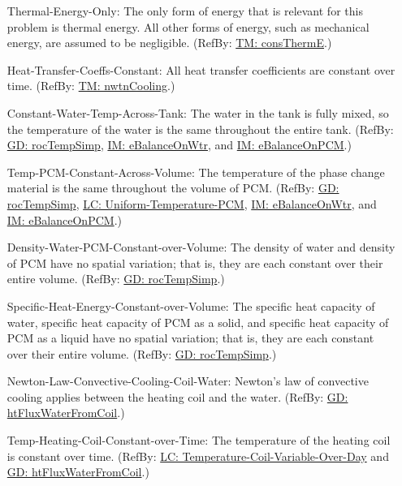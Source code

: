 \documentclass[12pt]{article}
\begin{document}
\begin{itemize}
\item[Thermal-Energy-Only:\phantomsection\label{assumpTEO}]{The only form of energy that is relevant for this problem is thermal energy. All other forms of energy, such as mechanical energy, are assumed to be negligible. (RefBy: \hyperref[TM:consThermE]{TM: consThermE}.)}
\item[Heat-Transfer-Coeffs-Constant:\phantomsection\label{assumpHTCC}]{All heat transfer coefficients are constant over time. (RefBy: \hyperref[TM:nwtnCooling]{TM: nwtnCooling}.)}
\item[Constant-Water-Temp-Across-Tank:\phantomsection\label{assumpCWTAT}]{The water in the tank is fully mixed, so the temperature of the water is the same throughout the entire tank. (RefBy: \hyperref[GD:rocTempSimp]{GD: rocTempSimp}, \hyperref[IM:eBalanceOnWtr]{IM: eBalanceOnWtr}, and \hyperref[IM:eBalanceOnPCM]{IM: eBalanceOnPCM}.)}
\item[Temp-PCM-Constant-Across-Volume:\phantomsection\label{assumpTPCAV}]{The temperature of the phase change material is the same throughout the volume of PCM. (RefBy: \hyperref[GD:rocTempSimp]{GD: rocTempSimp}, \hyperref[likeChgUTP]{LC: Uniform-Temperature-PCM}, \hyperref[IM:eBalanceOnWtr]{IM: eBalanceOnWtr}, and \hyperref[IM:eBalanceOnPCM]{IM: eBalanceOnPCM}.)}
\item[Density-Water-PCM-Constant-over-Volume:\phantomsection\label{assumpDWPCoV}]{The density of water and density of PCM have no spatial variation; that is, they are each constant over their entire volume. (RefBy: \hyperref[GD:rocTempSimp]{GD: rocTempSimp}.)}
\item[Specific-Heat-Energy-Constant-over-Volume:\phantomsection\label{assumpSHECov}]{The specific heat capacity of water, specific heat capacity of PCM as a solid, and specific heat capacity of PCM as a liquid have no spatial variation; that is, they are each constant over their entire volume. (RefBy: \hyperref[GD:rocTempSimp]{GD: rocTempSimp}.)}
\item[Newton-Law-Convective-Cooling-Coil-Water:\phantomsection\label{assumpLCCCW}]{Newton's law of convective cooling applies between the heating coil and the water. (RefBy: \hyperref[GD:htFluxWaterFromCoil]{GD: htFluxWaterFromCoil}.)}
\item[Temp-Heating-Coil-Constant-over-Time:\phantomsection\label{assumpTHCCoT}]{The temperature of the heating coil is constant over time. (RefBy: \hyperref[likeChgTCVOD]{LC: Temperature-Coil-Variable-Over-Day} and \hyperref[GD:htFluxWaterFromCoil]{GD: htFluxWaterFromCoil}.)}

\end{itemize}
\end{document}

